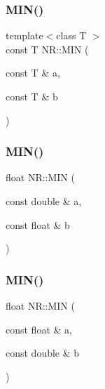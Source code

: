 \mbox{\label{namespaceNR_a15f220f878bd3544d0d5b2036cf73835}} 
\subsubsection{\texorpdfstring{MIN()}{MIN()}\hspace{0.1cm}{\footnotesize\ttfamily [1/3]}}
{\footnotesize\ttfamily template$<$class T $>$ \\
const T N\+R\+::\+M\+IN (\begin{DoxyParamCaption}\item[{const T \&}]{a,  }\item[{const T \&}]{b }\end{DoxyParamCaption})\hspace{0.3cm}{\ttfamily [inline]}}

\mbox{\label{namespaceNR_a5226e93da6f48d0d3702fa55e6c27052}} 
\subsubsection{\texorpdfstring{MIN()}{MIN()}\hspace{0.1cm}{\footnotesize\ttfamily [2/3]}}
{\footnotesize\ttfamily float N\+R\+::\+M\+IN (\begin{DoxyParamCaption}\item[{const double \&}]{a,  }\item[{const float \&}]{b }\end{DoxyParamCaption})\hspace{0.3cm}{\ttfamily [inline]}}

\mbox{\label{namespaceNR_a73fa23c417e474fe668884249420b5d9}} 
\subsubsection{\texorpdfstring{MIN()}{MIN()}\hspace{0.1cm}{\footnotesize\ttfamily [3/3]}}
{\footnotesize\ttfamily float N\+R\+::\+M\+IN (\begin{DoxyParamCaption}\item[{const float \&}]{a,  }\item[{const double \&}]{b }\end{DoxyParamCaption})\hspace{0.3cm}{\ttfamily [inline]}}

